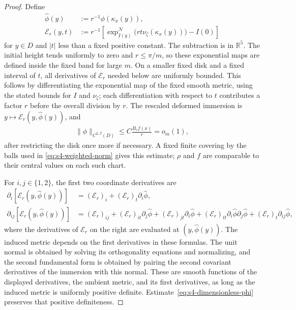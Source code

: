 \documentclass[a4paper,11pt,oneside,reqno]{amsart}
\numberwithin{equation}{section}
\theoremstyle{definition}
\begin{document}
\begin{proof}
    Define
    \begin{align*}
        \widehat\phi(y)&:=r^{-1}\phi(\kappa_x(y)),\\
        \mathcal E_r(y,t)&:=r^{-1}\left[
          \exp_{I(y)}^{\mathcal N}
            \bigl(rt\nu_\zeta(\kappa_x(y))\bigr)-I(0)
          \right]
    \end{align*}
    for $y\in D$ and $|t|$ less than a fixed positive
    constant. The subtraction is in $\mathbb R^5$.
    The initial height tends uniformly to zero and
    $r\leq\pi/m$, so these exponential maps are defined
    inside the fixed band for large $m$.
    On a smaller fixed disk and a fixed interval of $t$,
    all derivatives of $\mathcal E_r$ needed below are
    uniformly bounded. This follows by differentiating
    the exponential map of the fixed smooth metric,
    using the stated bounds for $I$ and $\nu_\zeta$;
    each differentiation with respect to $t$ contributes
    a factor $r$ before the overall division by $r$.
    The rescaled deformed immersion is
    $y\mapsto\mathcal E_r(y,\widehat\phi(y))$, and
    \begin{align*}
        \|\widehat\phi\|_{C^{2,\beta}(D)}
        \leq C\frac{B_\tau f(x)}r=o_m(1),
    \end{align*}
    after restricting the disk once more if necessary.
    A fixed finite covering by the balls used in
    \eqref{eq:s4-weighted-norm} gives this estimate;
    $\rho$ and $f$ are comparable to their central
    values on each such chart.

    For $i,j\in\{1,2\}$, the first two coordinate
    derivatives are
    \begin{align*}
        \partial_i[\mathcal E_r(y,\widehat\phi(y))]
        &=(\mathcal E_r)_i
             +(\mathcal E_r)_t\partial_i\widehat\phi,\\
        \partial_{ij}[\mathcal E_r(y,\widehat\phi(y))]
        &=(\mathcal E_r)_{ij}
             +(\mathcal E_r)_{it}\partial_j\widehat\phi
             +(\mathcal E_r)_{jt}\partial_i\widehat\phi+(\mathcal E_r)_{tt}
                  \partial_i\widehat\phi\partial_j\widehat\phi
             +(\mathcal E_r)_t\partial_{ij}\widehat\phi,
    \end{align*}
    where the derivatives of $\mathcal E_r$ on the
    right are evaluated at $(y,\widehat\phi(y))$.
    The induced metric depends on the first derivatives
    in these formulas. The unit normal is obtained by
    solving its orthogonality equations and normalizing,
    and the second fundamental form is obtained by
    pairing the second covariant derivatives of the
    immersion with this normal. These are smooth
    functions of the displayed derivatives, the ambient
    metric, and its first derivatives, as long as the
    induced metric is uniformly positive definite.
    Estimate~\eqref{eq:s4-dimensionless-phi} preserves
    that positive definiteness.


\end{proof}
\end{document}
